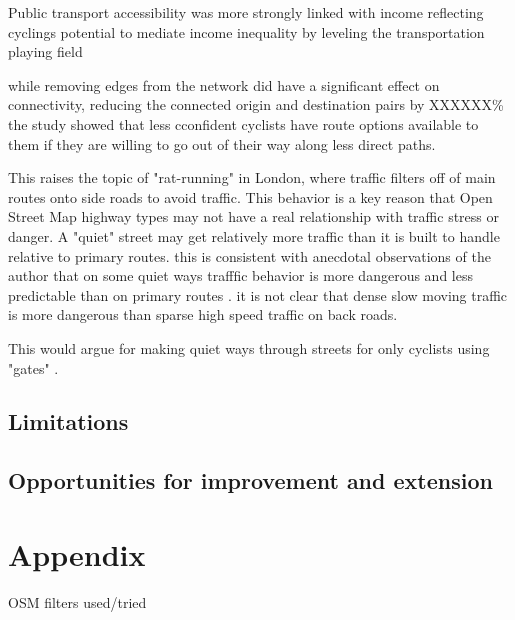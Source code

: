 \documentclass[11pt]{article} %
\begin{document}
Public transport accessibility was more strongly linked with income reflecting cyclings potential to mediate income inequality by leveling the transportation playing field

while removing edges from the network did have a significant effect on connectivity, reducing the connected origin and destination pairs by XXXXXX\% the study showed that less cconfident cyclists have route options available to them if they are willing to go out of their way along less direct paths. 

This raises the topic of "rat-running" in London, where traffic filters off of main routes onto side roads to avoid traffic. This behavior is a key reason that Open Street Map highway types may not have a real relationship with traffic stress or danger. A "quiet" street may get relatively more traffic than it is built to handle relative to primary routes. this is consistent with anecdotal observations of the author that on some quiet ways trafffic behavior is more dangerous and less predictable than on primary routes . it is not clear that dense slow moving traffic is more dangerous than sparse high speed traffic on back roads. 

This would argue for making quiet ways through streets for only cyclists using "gates" . 

\subsection{Limitations}



\subsection{Opportunities for improvement and extension}



\section{Appendix}

OSM filters used/tried
\end{document}
